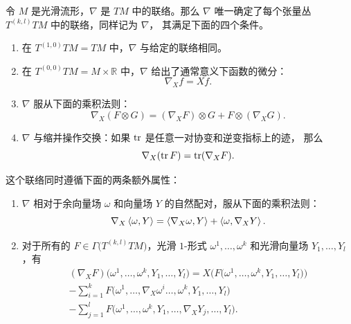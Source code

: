 \begin{proposition}
  令 $M$ 是光滑流形，$\nabla$ 是 $TM$ 中的联络。那么 $\nabla$
  唯一确定了每个张量丛 $T^{(k,l)}TM$ 中的联络，同样记为 $\nabla$，
  其满足下面的四个条件。
  \begin{enumerate}
    \item 在 $T^{(1,0)}TM=TM$ 中，$\nabla$ 与给定的联络相同。
    \item 在 $T^{(0,0)}TM=M\times \mathbb{R}$ 中，$\nabla$ 给出了通常意义下函数的微分：
    \[
      \nabla_Xf=Xf.  
    \]
    \item $\nabla$ 服从下面的乘积法则：
    \[
      \nabla_X(F\otimes G)=(\nabla_XF)\otimes G+F\otimes(\nabla_XG).  
    \]
    \item $\nabla$ 与缩并操作交换：如果 $\operatorname{tr}$ 是任意一对协变和逆变指标上的迹，
    那么
    \[
      \nabla_X(\operatorname{tr} F)=\operatorname{tr}(\nabla_XF).  
    \]
  \end{enumerate}
  这个联络同时遵循下面的两条额外属性：
  \begin{enumerate}[label=(\alph{*})]
    \item $\nabla$ 相对于余向量场 $\omega$ 和向量场 $Y$ 的自然配对，服从下面的乘积法则：
    \[
      \nabla_X\left\langle \omega,Y\right\rangle=\left\langle \nabla_X\omega,Y\right\rangle+\left\langle \omega,\nabla_XY\right\rangle.  
    \]
    \item 对于所有的 $F\in\Gamma\bigl(T^{(k,l)}TM\bigr)$，光滑 $1$-形式
    $\omega^1,\dots,\omega^k$ 和光滑向量场 $Y_1,\dots,Y_l$，有
    \begin{equation}\label{eq:convariant derivative of tensor field}
      \begin{gathered}
        (\nabla_XF)\bigl(\omega^1,\dots,\omega^k,Y_1,\dots,Y_l\bigr)=
        X\bigl(F\bigl(\omega^1,\dots,\omega^k,Y_1,\dots,Y_l\bigr)\bigr)\\
        -\sum_{i=1}^kF\bigl(\omega^1,\dots,\nabla_X\omega^i\dots,\omega^k,Y_1,\dots,Y_l\bigr)\\
        -\sum_{j=1}^lF\bigl(\omega^1,\dots,\omega^k,Y_1,\dots,\nabla_XY_j,\dots,Y_l\bigr).
      \end{gathered}
    \end{equation}
  \end{enumerate}
\end{proposition}
